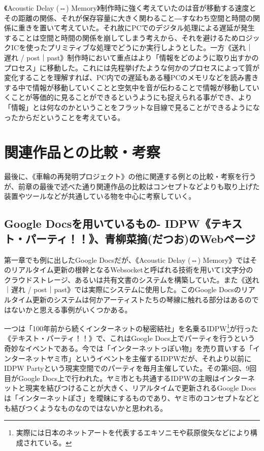 \documentclass[a4paper,report]{jsbook}
\begin{document}
《Acoustic Delay (⇔)
Memory》制作時に強く考えていたのは音が移動する速度とその距離の関係、それが保存容量に大きく関わること―すなわち空間と時間の関係に重きを置いて考えていた。それ故にPCでのデジタル処理による遅延が発生することは空間と時間の関係を崩してしまう考えから、それを避けるためロジックICを使ったプリミティブな処理でどうにか実行しようとした。一方《送れ｜遅れ
/
post｜past》制作時において重点はより「情報をどのように取り出すかのプロセス」に移動した。これには先程挙げたような何かのプロセスによって質が変化することを理解すれば、PC内での遅延もある種PCのメモリなどを読み書きする中で情報が移動していくことと空気中を音が伝わることで情報が移動していくことが等価的に見ることができるというようにも捉えられる事ができ、より「情報」とは何なのかということをフラットな目線で見ることができるようになったからだということを考えている。

\section{関連作品との比較・考察}\label{ux95a2ux9023ux4f5cux54c1ux3068ux306eux6bd4ux8f03ux8003ux5bdf}

最後に、《車輪の再発明プロジェクト》の他に関連する例との比較・考察を行うが、前章の最後で述べた通り関連作品の比較はコンセプトなどよりも取り上げた装置やツールなどが共通している物を中心に考察していく。

\subsection{Google Docsを用いているもの-
IDPW《テキスト・パーティ！！》、青柳菜摘(だつお)のWebページ}\label{google-docsux3092ux7528ux3044ux3066ux3044ux308bux3082ux306e--idpwux30c6ux30adux30b9ux30c8ux30d1ux30fcux30c6ux30a3ux9752ux67f3ux83dcux6458ux3060ux3064ux304aux306ewebux30daux30fcux30b8}

第一章でも例に出したGoogle Docsだが、《Acoustic Delay (⇔)
Memory》ではそのリアルタイム更新の根幹となるWebsocketと呼ばれる技術を用いて1文字分のクラウドストレージ、あるいは共有文書のシステムを構築していた。また《送れ｜遅れ
/ post｜past》では実際にシステムに使用した。このGoogle
Docsのリアルタイム更新のシステムは何かアーティストたちの琴線に触れる部分はあるのではないかと思える事例がいくつかある。

一つは「100年前から続くインターネットの秘密結社」を名乗るIDPW\footnote{実際には日本のネットアートを代表するエキソニモや萩原俊矢などにより構成されている。}が行った《テキスト・パーティ！！》で、これはGoogle
Docs上でパーティを行うという奇妙なイベントである。今では「インターネットっぽい物」を売り買いする「インターネットヤミ市」というイベントを主催するIDPWだが、それより以前にIDPW
Partyという現実空間でのパーティを毎月主催していた\autocite{textparty1}。その第8回、9回目がGoogle
Docs上で行われた。\autocites{textparty8}{textparty9}ヤミ市とも共通するIDPWの主眼はインターネットと現実を結びつけることが大きく、リアルタイムで更新されるGoogle
Docsは「インターネットぽさ」を曖昧にするものであり、ヤミ市のコンセプトなどとも結びつくようなものなのではないかと思われる。
\end{document}
